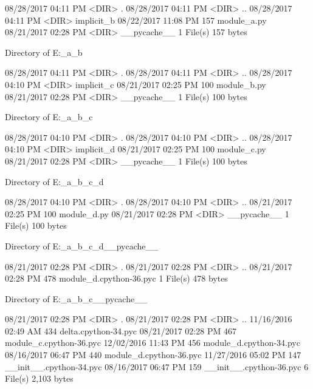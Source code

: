 08/28/2017  04:11 PM    <DIR>          .
08/28/2017  04:11 PM    <DIR>          ..
08/28/2017  04:11 PM    <DIR>          implicit_b
08/22/2017  11:08 PM               157 module_a.py
08/21/2017  02:28 PM    <DIR>          __pycache__
               1 File(s)            157 bytes

 Directory of E:\Python\apeman\mockup\simple\implicit_a\implicit_b

08/28/2017  04:11 PM    <DIR>          .
08/28/2017  04:11 PM    <DIR>          ..
08/28/2017  04:10 PM    <DIR>          implicit_c
08/21/2017  02:25 PM               100 module_b.py
08/21/2017  02:28 PM    <DIR>          __pycache__
               1 File(s)            100 bytes

 Directory of E:\Python\apeman\mockup\simple\implicit_a\implicit_b\implicit_c

08/28/2017  04:10 PM    <DIR>          .
08/28/2017  04:10 PM    <DIR>          ..
08/28/2017  04:10 PM    <DIR>          implicit_d
08/21/2017  02:25 PM               100 module_c.py
08/21/2017  02:28 PM    <DIR>          __pycache__
               1 File(s)            100 bytes

 Directory of E:\Python\apeman\mockup\simple\implicit_a\implicit_b\implicit_c\implicit_d

08/28/2017  04:10 PM    <DIR>          .
08/28/2017  04:10 PM    <DIR>          ..
08/21/2017  02:25 PM               100 module_d.py
08/21/2017  02:28 PM    <DIR>          __pycache__
               1 File(s)            100 bytes

 Directory of E:\Python\apeman\mockup\simple\implicit_a\implicit_b\implicit_c\implicit_d\__pycache__

08/21/2017  02:28 PM    <DIR>          .
08/21/2017  02:28 PM    <DIR>          ..
08/21/2017  02:28 PM               478 module_d.cpython-36.pyc
               1 File(s)            478 bytes

 Directory of E:\Python\apeman\mockup\simple\implicit_a\implicit_b\implicit_c\__pycache__

08/21/2017  02:28 PM    <DIR>          .
08/21/2017  02:28 PM    <DIR>          ..
11/16/2016  02:49 AM               434 delta.cpython-34.pyc
08/21/2017  02:28 PM               467 module_c.cpython-36.pyc
12/02/2016  11:43 PM               456 module_d.cpython-34.pyc
08/16/2017  06:47 PM               440 module_d.cpython-36.pyc
11/27/2016  05:02 PM               147 __init__.cpython-34.pyc
08/16/2017  06:47 PM               159 __init__.cpython-36.pyc
               6 File(s)          2,103 bytes

